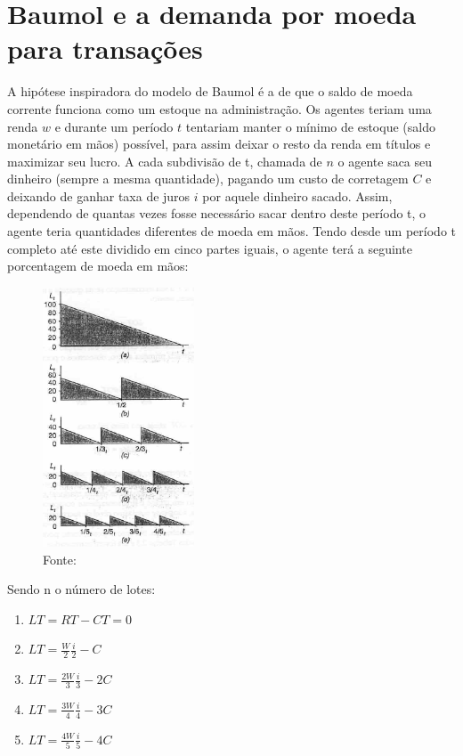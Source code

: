 \documentclass[12pt,a4paper,oneside,brazil]{abntex2}
\begin{document}
\section{Baumol e a demanda por moeda para transações}
A hipótese inspiradora do modelo de Baumol é a de que o saldo de moeda corrente funciona como um estoque na administração. Os agentes teriam uma renda $w$ e durante um período $t$ tentariam manter o mínimo de estoque (saldo monetário em mãos) possível, para assim deixar o resto da renda em títulos e maximizar seu lucro. A cada subdivisão de t, chamada de $n$ o agente saca seu dinheiro (sempre a mesma quantidade), pagando um custo de corretagem $C$ e deixando de ganhar taxa de juros $i$ por aquele dinheiro sacado. Assim, dependendo de quantas vezes fosse necessário sacar dentro deste período t, o agente teria quantidades diferentes de moeda em mãos. Tendo desde um período t completo até este dividido em cinco partes iguais, o agente terá a seguinte porcentagem de moeda em mãos:
\begin{figure}
	\includegraphics[width=0.4\textwidth]{Baumol.png}
	\centering
	\caption{Fonte: \cite[p. 89]{rossetti98}}
	
\end{figure}
\newline \newline

Sendo n o número de lotes:
\begin{enumerate}
\item $LT = RT - CT = 0$
\item $LT = \frac{W}{2} \frac{i}{2} - C$
\item $LT = \frac{2 W}{3} \frac{i}{3} - 2C$
\item $LT = \frac{3 W}{4} \frac{i}{4} - 3C$
\item $LT = \frac{4 W}{5} \frac{i}{5} - 4C$
\end{enumerate}
\end{document}
